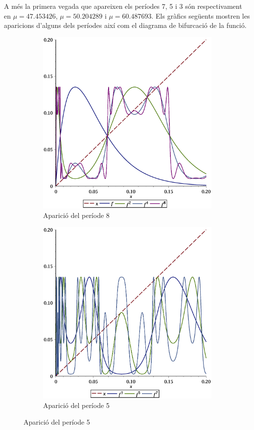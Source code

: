\documentclass[a4paper]{article}
\theoremstyle{definition}
\begin{document}
A més la primera vegada que apareixen els períodes 7, 5 i 3 són respectivament en $\mu = 47.453426$, $\mu= 50.204289$ i $\mu = 60.487693$.
Els gràfics següents mostren les aparicions d'alguns dels períodes així com el diagrama de bifurcació de la funció.
\begin{figure}[ht]
  \begin{subfigure}[ht]{0.45\linewidth}
    \centering
    \includegraphics[width=\linewidth]{Images/map62.eps}
    \caption{Aparició del període 8}
  \end{subfigure}
  \hfill
  \begin{subfigure}[ht]{0.45\linewidth}
    \centering
    \includegraphics[width=\linewidth]{Images/map65.eps}
    \caption{Aparició del període 5}
  \end{subfigure}
\end{figure}
\end{document}
